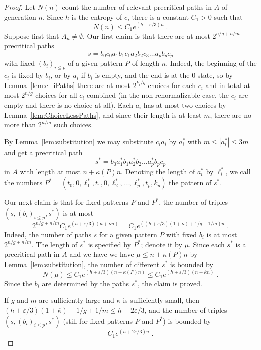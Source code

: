 \documentclass[12pt]{amsart}
\newcommand{\0}{\texttt{0}}
\newcommand{\1}{\texttt{1}}
\newcommand\eps{\varepsilon}
\theoremstyle{definition}
\numberwithin{equation}{section}
\newcommand{\ovl}[1]{\overline{#1}}
\begin{document}
\begin{proof}
Let $N(n)$ count the number of relevant precritical paths in $A$ of generation $n$. Since $h$ is the entropy of $c$, there is a constant $C_1>0$ such that
\[
N(n)\le C_1e^{(h+\eps/3)n} \;.
\]
Suppose first that $A_n\neq\emptyset$.
Our first claim is that there are at most $ 2^{{n}/{g}+{n}/{m}}$ precritical paths
\[
s=b_0c_0 a_1b_1c_1a_2b_2c_3\dots a_pb_pc_p
\]
with fixed $(b_i)_{i\le p}$ of a given pattern $P$ of length $n$. Indeed, the beginning of the $c_i$ is fixed by $b_i$, or by $a_i$ if $b_i$ is empty, and the end is at the $0$ state, so by Lemma~\ref{lem:c_iPaths} there are at most $2^{k_i/g}$ choices for each $c_i$ and in total at most $2^{n/g}$ choices for all $c_i$ combined (in the non-renormalizable case, the $c_i$ are empty and there is no choice at all). Each $a_i$ has at most two choices by Lemma~\ref{lem:ChoiceLessPaths}, and since their length is at least $m$, there are no more than $2^{n/m}$ such choices.  


By Lemma~\ref{lem:substitution} we may substitute $c_ia_i$ by $a^*_i$ with $m\le |a^*_i|\le 3m$ and get a precritical path
\[s^*=b_0a^*_1b_1a^*_2b_2\dots a^*_pb_p c_p\] 
in $A$ with length at most $ n+\kappa(P) n $. Denoting the length of $a_i^*$ by $\ell_i^*$, we call the numbers $P^*=(t_0,0, \ell^*_1, t_1,0,\ell^*_2,\dots,\ell^*_p,t_p,k_p)$ the pattern of $s^*$. 

Our next claim is that for fixed patterns $P$ and $P^*$, the number of triples $(s,(b_i)_{i\le p},s^*)$ is at most
\[
2^{{n}/{g}+ {n}/{m}}C_1 e^{(h+\eps/3)(n+\ovl\kappa n)}=C_1e^{((h+\eps/3)(1+\ovl \kappa)+ 1/g+1/m)n}
\;.
\]
Indeed, the number of paths $s$ for a given pattern $P$ with fixed $b_i$ is at most $2^{{n}/{g}+ {n}/{m}}$. The length of $s^*$ is specified by $P^*$; denote it by $\mu$.  Since each $s^*$ is a precritical path in $A$ and we have we have $\mu\le n+\kappa(P)n$ by Lemma~\ref{lem:substitution},  the number of different $s^*$ is bounded by 
\[
N(\mu)\le  C_1e^{(h +\eps/3)(n+\kappa (P)n)}\le C_1 e^{(h+\eps/3)(n+\ovl\kappa n)} 
\;.
\]
Since the $b_i$ are determined by the paths $s^*$, the claim is proved.




If $g$ and $m$ are sufficiently large and $\ovl \kappa$ is sufficiently small, then $(h+\eps/3)(1+\ovl \kappa)+ 1/g+1/m\le h+2\eps/3$, and the number of triples $(s,(b_i)_{i\le p},s^*)$ {(still for fixed patterns $P$ and $P^*$)} is bounded by
\[
C_1e^{(h+2\eps/3)n}
\;.
\]


\end{proof}
\end{document}
